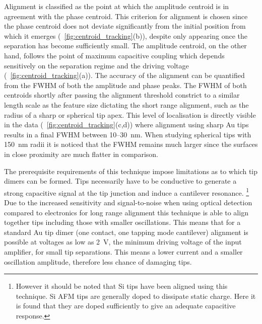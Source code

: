 \documentclass{article}
\begin{document}
Alignment is classified as the point at which the amplitude centroid is in agreement with the phase centroid. This criterion for alignment is chosen since the phase centroid does not deviate significantly from the initial position from which it emerges (\figurename~\ref{fig:centroid_tracking}(b)), despite only appearing once the separation has become sufficiently small. The amplitude centroid, on the other hand, follows the point of maximum capacitive coupling which depends sensitively on the separation regime and the driving voltage (\figurename~\ref{fig:centroid_tracking}(a)).
The accuracy of the alignment can be quantified from the FWHM of both the amplitude and phase peaks. The FWHM of both centroids shortly after passing the alignment threshold constrict to a similar length scale as the feature size dictating the short range alignment, such as the radius of a sharp or spherical tip apex. This level of localisation is directly visible in the data (\figurename~\ref{fig:centroid_tracking}(c,d)) where alignment using sharp Au tips results in a final FWHM between 10--\SI{30}{nm}. When studying spherical tips with \SI{150}{nm} radii it is noticed that the FWHM remains much larger since the surfaces in close proximity are much flatter in comparison. %

The prerequisite requirements of this technique impose limitations as to which tip dimers can be formed. Tips necessarily have to be conductive to generate a strong capacitive signal at the tip junction and induce a cantilever resonance.%
\footnote{However it should be noted that Si tips have been aligned using this technique. Si AFM tips are generally doped to dissipate static charge. Here it is found that they are doped sufficiently to give an adequate capacitive response.}
Due to the increased sensitivity and signal-to-noise when using optical detection compared to electronics for long range alignment this technique is able to align together tips including those with smaller oscillations. This means that for a standard Au tip dimer (one contact, one tapping mode cantilever) alignment is possible at voltages as low as \SI{2}{V}, the minimum driving voltage of the input amplifier, for small tip separations. This means a lower current and a smaller oscillation amplitude, therefore less chance of damaging tips.
\end{document}
